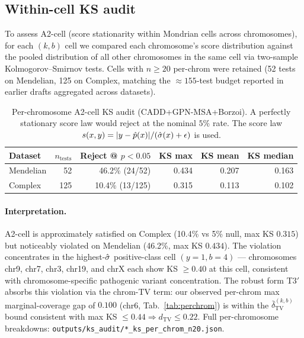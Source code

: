 \subsection{Within-cell KS audit}
\label{app:data:ks}

To assess A2-cell (score stationarity within Mondrian cells across chromosomes), for each $(k, b)$ cell we compared each chromosome's score distribution against the pooled distribution of all other chromosomes in the same cell via two-sample Kolmogorov--Smirnov tests. Cells with $n \geq 20$ per-chrom were retained (52 tests on Mendelian, 125 on Complex, matching the $\approx 155$-test budget reported in earlier drafts aggregated across datasets).

\begin{table}[h]
\centering
\small
\caption{Per-chromosome A2-cell KS audit (CADD+GPN-MSA+Borzoi). A perfectly stationary score law would reject at the nominal $5\%$ rate. The score law $s(x,y) = |y - \hat{p}(x)| / (\hat{\sigma}(x) + \epsilon)$ is used.}
\label{tab:ks_audit}
\begin{tabular}{lrrrrr}
\toprule
Dataset & $n_{\text{tests}}$ & Reject @ $p{<}0.05$ & KS max & KS mean & KS median \\
\midrule
Mendelian & 52  & 46.2\% (24/52)  & 0.434 & 0.207 & 0.163 \\
Complex   & 125 & 10.4\% (13/125) & 0.315 & 0.113 & 0.102 \\
\bottomrule
\end{tabular}
\end{table}

\paragraph{Interpretation.} A2-cell is approximately satisfied on Complex (10.4\% vs 5\% null, max KS $0.315$) but noticeably violated on Mendelian (46.2\%, max KS $0.434$). The violation concentrates in the highest-$\hat{\sigma}$ positive-class cell $(y{=}1, b{=}4)$ --- chromosomes chr9, chr7, chr3, chr19, and chrX each show KS $\geq 0.40$ at this cell, consistent with chromosome-specific pathogenic variant concentration. The robust form T3$'$ absorbs this violation via the chrom-TV term: our observed per-chrom max marginal-coverage gap of $0.100$ (chr6, Tab.~\ref{tab:perchrom}) is within the $\bar\delta_{\mathrm{TV}}^{(k,b)}$ bound consistent with max KS $\leq 0.44 \Rightarrow d_{\mathrm{TV}} \leq 0.22$. Full per-chromosome breakdowns: \texttt{outputs/ks\_audit/*\_ks\_per\_chrom\_n20.json}.

